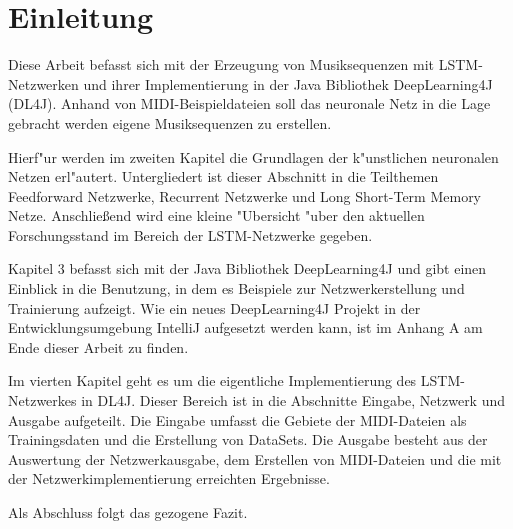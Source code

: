 \chapter{Einleitung}
{
Diese Arbeit befasst sich mit der Erzeugung von Musiksequenzen mit LSTM-Netzwerken und ihrer Implementierung in der Java Bibliothek DeepLearning4J (DL4J). Anhand von MIDI-Beispieldateien soll das neuronale Netz in die Lage gebracht werden eigene Musiksequenzen zu erstellen.

Hierf"ur werden im zweiten Kapitel die Grundlagen der k"unstlichen neuronalen Netzen erl"autert. Untergliedert ist dieser Abschnitt in die Teilthemen Feedforward Netzwerke, Recurrent Netzwerke und Long Short-Term Memory Netze. Anschlie{\ss}end wird eine kleine "Ubersicht "uber den aktuellen Forschungsstand im Bereich der LSTM-Netzwerke gegeben.

Kapitel 3 befasst sich mit der Java Bibliothek DeepLearning4J und gibt einen Einblick in die Benutzung, in dem es Beispiele zur Netzwerkerstellung und Trainierung aufzeigt. Wie ein neues DeepLearning4J Projekt in der Entwicklungsumgebung IntelliJ aufgesetzt werden kann, ist im Anhang A am Ende dieser Arbeit zu finden.

Im vierten Kapitel geht es um die eigentliche Implementierung des LSTM-Netzwerkes in DL4J. Dieser Bereich ist in die Abschnitte Eingabe, Netzwerk und Ausgabe aufgeteilt. Die Eingabe umfasst die Gebiete der MIDI-Dateien als Trainingsdaten und die Erstellung von DataSets. Die Ausgabe besteht aus der Auswertung der Netzwerkausgabe, dem Erstellen von MIDI-Dateien und die mit der Netzwerkimplementierung erreichten Ergebnisse.

Als Abschluss folgt das gezogene Fazit.

} %